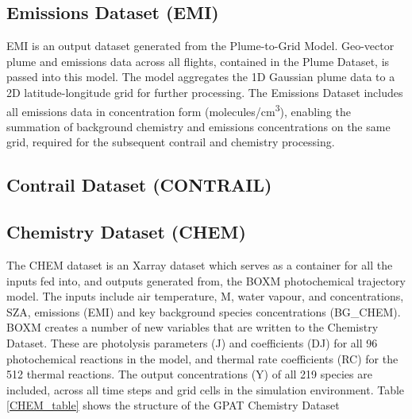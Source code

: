 \subsection{Emissions Dataset (EMI)}
EMI is an output dataset generated from the Plume-to-Grid Model. Geo-vector plume and emissions data across all flights, contained in the Plume Dataset, is passed into this model. The model aggregates the 1D Gaussian plume data to a 2D latitude-longitude grid for further processing. The Emissions Dataset includes all emissions data in concentration form (molecules/cm\textsuperscript{3}), enabling the summation of background chemistry and emissions concentrations on the same grid, required for the subsequent contrail and chemistry processing.

\subsection{Contrail Dataset (CONTRAIL)}

\subsection{Chemistry Dataset (CHEM)}
The CHEM dataset is an Xarray dataset which serves as a container for all the inputs fed into, and outputs generated from, the BOXM photochemical trajectory model. The inputs include air temperature, M, water vapour,  and  concentrations, SZA, emissions (EMI) and key background species concentrations (BG\_CHEM). BOXM creates a number of new variables that are written to the Chemistry Dataset. These are photolysis parameters (J) and coefficients (DJ) for all 96 photochemical reactions in the model, and thermal rate coefficients (RC) for the 512 thermal reactions. The output concentrations (Y) of all 219 species are included, across all time steps and grid cells in the simulation environment. Table \ref{CHEM_table} shows the structure of the GPAT Chemistry Dataset





